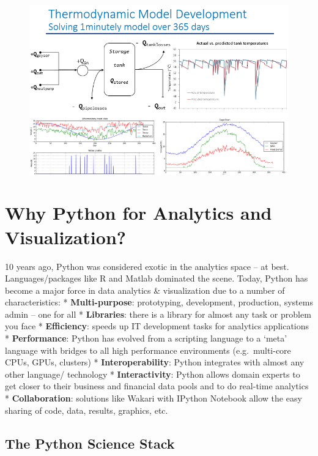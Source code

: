 \documentclass{article}
\begin{document}
\begin{figure}[htbp]
\centering
\includegraphics{static/img/hotwater.png}
\end{figure}

    \section{Why Python for Analytics and Visualization?}

10 years ago, Python was considered exotic in the analytics space -- at
best. Languages/packages like R and Matlab dominated the scene. Today,
Python has become a major force in data analytics \& visualization due
to a number of characteristics: * \textbf{Multi-purpose}: prototyping,
development, production, systems admin -- one for all *
\textbf{Libraries}: there is a library for almost any task or problem
you face * \textbf{Efficiency}: speeds up IT development tasks for
analytics applications * \textbf{Performance}: Python has evolved from a
scripting language to a `meta' language with bridges to all high
performance environments (e.g.~multi-core CPUs, GPUs, clusters) *
\textbf{Interoperability}: Python integrates with almost any other
language/ technology * \textbf{Interactivity}: Python allows domain
experts to get closer to their business and financial data pools and to
do real-time analytics * \textbf{Collaboration}: solutions like Wakari
with IPython Notebook allow the easy sharing of code, data, results,
graphics, etc.

    \subsection{The Python Science Stack}
\end{document}
